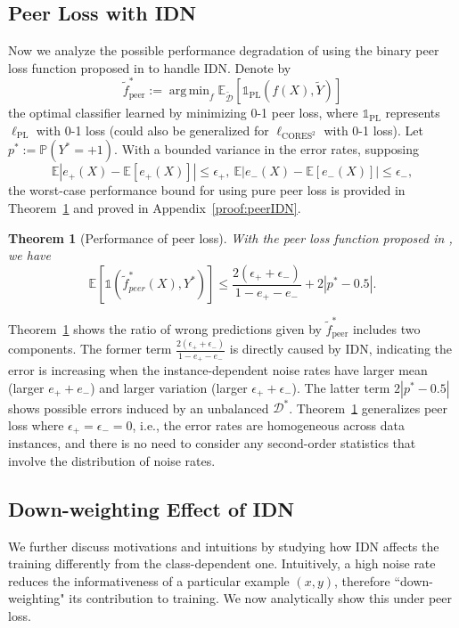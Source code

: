 \documentclass[final]{cvpr}
\DeclareMathOperator*{\argmin}{arg\,min}
\newcommand{\PP}{\mathbb P}
\newcommand{\BR}{\mathds 1}
\newcommand{\E}{\mathbb E}
\newtheorem{theorem}{Theorem}
\newcommand{\rev}[1]{{\color{blue}#1}}
\newcommand{\rev}[1]{#1}
\begin{document}
\subsection{Peer Loss with IDN}\label{sec:pure_peer_IDN}


Now we analyze the possible performance degradation of using the binary peer loss function proposed in \cite{liu2019peer} to handle IDN. 
Denote by $$\tilde f^*_{\text{peer}}  := \argmin_{f} \E_{\widetilde {\mathcal D}} \left[ {\BR_{\text{PL}}}(f(X), \widetilde Y)  \right]$$ the optimal classifier learned by minimizing 0-1 peer loss, where ${\BR_{\text{PL}}}$ represents $\ell_{\text{PL}}$ with 0-1 loss (could also be generalized for $\ell_{\text{CORES}^2}$ with 0-1 loss).
\rev{Let $p^*:= \PP(Y^*=+1)$.}
With a bounded variance in the error rates, supposing 
\[
\E|e_+(X)-\E[e_+(X)]|\leq \epsilon_+, ~ \E|e_-(X)-\E[e_-(X)]| \leq \epsilon_-,
\]
the worst-case performance bound for using pure peer loss is provided in Theorem~\ref{thm:peerIDN} and proved in Appendix~\ref{proof:peerIDN}.

\begin{theorem}[Performance of peer loss]\label{thm:peerIDN}
With the peer loss function proposed in \cite{liu2019peer}, we have
\[
\E[\BR(\tilde f^*_{peer}(X),Y^*)] \leq \frac{2(\epsilon_+ + \epsilon_-)}{1-e_+-e_-} + 2|p^*-0.5|.
\]
\end{theorem}
Theorem~\ref{thm:peerIDN} shows the ratio of wrong predictions given by $\tilde f^*_{\text{peer}}$ includes two components. The former term $\frac{2(\epsilon_+ + \epsilon_-)}{1-e_+-e_-}$ is directly caused by IDN, indicating the error is increasing when the instance-dependent noise rates have larger mean (larger $e_+ + e_-$) and larger \rev{variation} (larger $\epsilon_+ + \epsilon_-$).
The latter term $2|p^*-0.5|$ shows possible errors induced by an unbalanced $\mathcal D^*$.
Theorem~\ref{thm:peerIDN} generalizes peer loss where $\epsilon_+=\epsilon_-=0$, i.e., the error rates are homogeneous across data instances, and there is no need to consider any second-order statistics that involve the distribution of noise rates.

\subsection{Down-weighting Effect of IDN}\label{sec:down-weight}

\rev{We further discuss motivations and intuitions by studying}
how IDN affects the training differently from the class-dependent one. Intuitively, a high noise rate reduces the informativeness of a particular example $(x,y)$, therefore ``down-weighting" its contribution to training. We now analytically show this under peer loss. 
\end{document}
